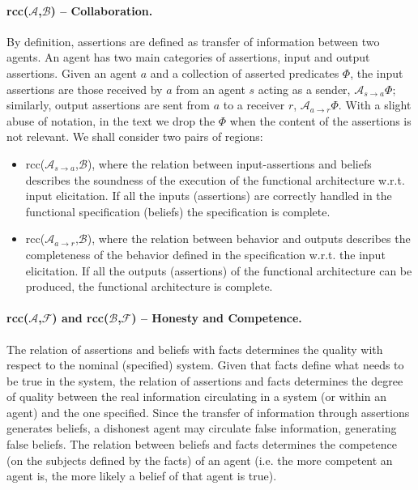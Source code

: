 \documentclass[runningheads]{llncs}
\newcommand{\assertionRegion}{\mathcal{A}}
\newcommand{\beliefRegion}{\mathcal{B}}
\newcommand{\factRegion}{\mathcal{F}}
\newcommand{\Rcc}[2]{rcc(#1,#2)}
\newcommand{\rassert}[3]{\mathcal{A}_{#1\rightarrow #2}#3}
\begin{document}
\paragraph{\Rcc{$\assertionRegion$}{$\beliefRegion$} -- Collaboration.} 
By definition, assertions are defined as transfer of information
between two agents. An agent has two main categories of assertions,
input and output assertions.  Given an agent $a$ and a collection of asserted
predicates $\Phi$,
the input assertions are those received by $a$ from an agent
$s$ acting as a sender, $\rassert{s}{a}{\Phi}$; similarly, output assertions
are sent from $a$ to a receiver $r$, $\rassert{a}{r}{\Phi}$. With a slight abuse
of notation, in the text we drop the $\Phi$ when the content of the assertions is not relevant.
We shall consider
two pairs of regions:
\begin{itemize}
	\item \Rcc{$\assertionRegion_{s\rightarrow a}$}{$\beliefRegion$},
		where the relation between input-assertions and beliefs
		describes the soundness of the execution of the functional
		architecture w.r.t. input elicitation.
		If all the inputs (assertions) are correctly
		handled in the functional specification (beliefs) the
		specification is complete.

	\item \Rcc{$\assertionRegion_{a\rightarrow r}$}{$\beliefRegion$},
		where the relation between behavior and outputs describes the
		completeness of the behavior defined in the specification
		w.r.t. the input elicitation. If all the
		outputs (assertions) of the functional architecture can be
		produced, the functional architecture is complete.
\end{itemize}


\paragraph{\Rcc{$\assertionRegion$}{$\factRegion$} and
\Rcc{$\beliefRegion$}{$\factRegion$} -- Honesty and Competence.} 
The relation of assertions
and beliefs with facts determines the quality with respect to the nominal
(specified) system.  Given that facts define what needs to be true in the system,
the relation of assertions and facts determines the degree of quality between
the real information circulating in a system (or within an agent) and
the one specified.  Since the transfer of information
through assertions generates beliefs, a dishonest agent may circulate false
information, generating false beliefs.
The relation between beliefs and
facts determines the competence (on the subjects defined by the facts) of an
agent (i.e. the more competent an agent is, the more likely a belief of that
agent is true).
\end{document}
